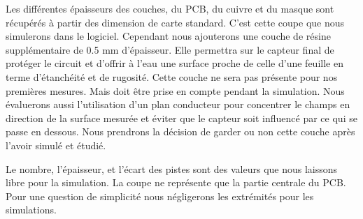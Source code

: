 Les différentes épaisseurs des couches, du PCB, du cuivre et du masque sont récupérés à partir des dimension de carte standard. C'est cette coupe que nous simulerons dans le logiciel. Cependant nous ajouterons une couche de résine supplémentaire de 0.5 mm d'épaisseur. Elle permettra sur le capteur final de protéger le circuit et d'offrir à l'eau une surface proche de celle d'une feuille en terme d'étanchéité et de rugosité. Cette couche ne sera pas présente pour nos premières mesures. Mais doit être prise en compte pendant la simulation. Nous évaluerons aussi l'utilisation d'un plan conducteur pour concentrer le champs en direction de la surface mesurée et éviter que le capteur soit influencé par ce qui se passe en dessous. Nous prendrons la décision de garder ou non cette couche après l'avoir simulé et étudié.

Le nombre, l'épaisseur, et l'écart des pistes sont des valeurs que nous laissons libre pour la simulation. La coupe ne représente que la partie centrale du PCB. Pour une question de simplicité nous négligerons les extrémités pour les simulations.

